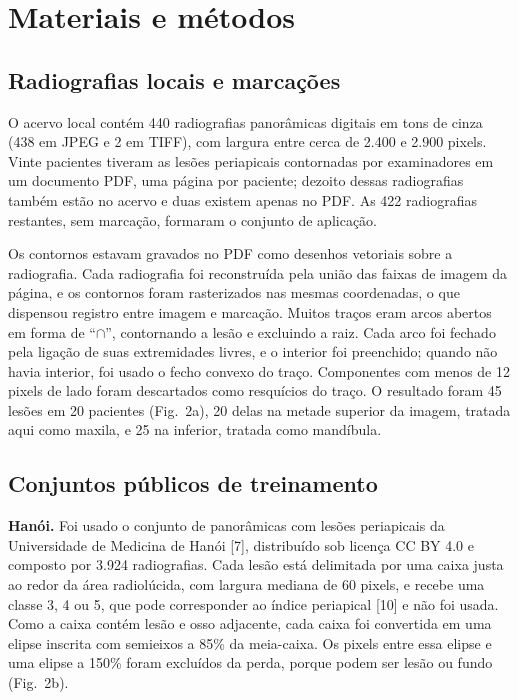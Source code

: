 \documentclass[twocolumn]{article}
\begin{document}

\section{Materiais e métodos}

\subsection{Radiografias locais e marcações}

O acervo local contém 440 radiografias panorâmicas digitais em tons de cinza (438 em JPEG e 2 em TIFF), com largura entre cerca de 2.400 e 2.900 pixels. Vinte pacientes tiveram as lesões periapicais contornadas por examinadores em um documento PDF, uma página por paciente; dezoito dessas radiografias também estão no acervo e duas existem apenas no PDF. As 422 radiografias restantes, sem marcação, formaram o conjunto de aplicação.

Os contornos estavam gravados no PDF como desenhos vetoriais sobre a radiografia. Cada radiografia foi reconstruída pela união das faixas de imagem da página, e os contornos foram rasterizados nas mesmas coordenadas, o que dispensou registro entre imagem e marcação. Muitos traços eram arcos abertos em forma de ``$\cap$'', contornando a lesão e excluindo a raiz. Cada arco foi fechado pela ligação de suas extremidades livres, e o interior foi preenchido; quando não havia interior, foi usado o fecho convexo do traço. Componentes com menos de 12 pixels de lado foram descartados como resquícios do traço. O resultado foram 45 lesões em 20 pacientes (Fig.~2a), 20 delas na metade superior da imagem, tratada aqui como maxila, e 25 na inferior, tratada como mandíbula.

\subsection{Conjuntos públicos de treinamento}

\textbf{Hanói.} Foi usado o conjunto de panorâmicas com lesões periapicais da Universidade de Medicina de Hanói [7], distribuído sob licença CC BY 4.0 e composto por 3.924 radiografias. Cada lesão está delimitada por uma caixa justa ao redor da área radiolúcida, com largura mediana de 60 pixels, e recebe uma classe 3, 4 ou 5, que pode corresponder ao índice periapical [10] e não foi usada. Como a caixa contém lesão e osso adjacente, cada caixa foi convertida em uma elipse inscrita com semieixos a 85\% da meia-caixa. Os pixels entre essa elipse e uma elipse a 150\% foram excluídos da perda, porque podem ser lesão ou fundo (Fig.~2b).
\end{document}
